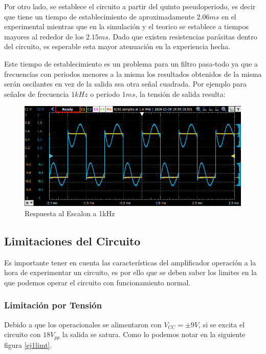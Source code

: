 Por otro lado, se establece el circuito a partir del quinto pseudoperiodo, es decir que tiene un tiempo de establecimiento de aproximadamente $2.06ms$ en el experimental mientras que en la simulación y el teorico se establece a tiempos mayores al rededor de los $2.15ms$. Dado que existen resistencias parásitas dentro del circuito, es esperable esta mayor atenuación en la experiencia hecha.

Este tiempo de establecimiento es un problema para un filtro pasa-todo ya que a frecuencias con periodos menores a la misma los resultados obtenidos de la misma serán oscilantes en vez de la salida sea otra señal cuadrada. Por ejemplo para señales de frecuencia $1kHz$ o periodo $1ms$, la tensión de salida resulta:

\begin{figure}[H]
    \centering
    \includegraphics[scale = 0.8]{../Ejercicio1-FiltroConGIC/Informe/re1k.png}
    \caption{Respuesta al Escalon a 1kHz}
    \label{ej1re1k}
\end{figure}

\subsection{Limitaciones del Circuito}

Es importante tener en cuenta las características del amplificador operación a la hora de experimentar un circuito, es por ello que se deben saber los limites en la que podemos operar el circuito con funcionamiento normal. 

\subsubsection{Limitación por Tensión}

Debido a que los operacionales se alimentaron con $V_{CC} = \pm 9V$, si se excita el circuito con $18V_{pp}$ la salida se satura. Como lo podemos notar en la siguiente figura \ref{ej1limt}.

